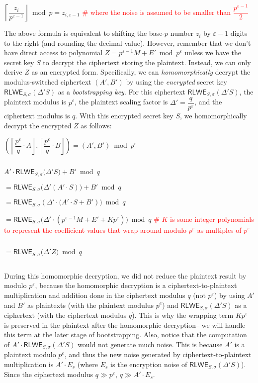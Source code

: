 $\left\lceil \dfrac{z_i}{p^{\varepsilon-1}} \right\rfloor \bmod p = z_{i,\varepsilon-1}$ \textcolor{red}{ \# where the noise is assumed to be smaller than $\dfrac{p^{\varepsilon-1}}{2}$}

The above formula is equivalent to shifting the base-$p$ number $z_i$ by $\varepsilon-1$ digits to the right (and rounding the decimal value). However, remember that we don't have direct access to polynomial $Z = p^{\varepsilon-1}M + E' \bmod p^\varepsilon$ unless we have the secret key $S$ to decrypt the ciphertext storing the plaintext. Instead, we can only derive $Z$ as an encrypted form. Specifically, we can \textit{homomorphically} decrypt the modulus-switched ciphertext $(A', B')$ by using the \textit{encrypted} secret key $\textsf{RLWE}_{S, \sigma}(\Delta' S)$ as a \textit{bootstrapping key}. For this ciphertext $\textsf{RLWE}_{S, \sigma}(\Delta' S)$, the plaintext modulus is $p^\varepsilon$, the plaintext scaling factor is $\Delta' = \dfrac{q}{p^\varepsilon}$, and the ciphertext modulus is $q$. With this encrypted secret key $S$, we homomorphically decrypt the encrypted $Z$ as follows: 


$\left(\left\lceil \dfrac{p^\varepsilon}{q}\cdot A\right\rfloor, \left\lceil \dfrac{p^\varepsilon}{q}\cdot B\right\rfloor\right) = (A', B') \bmod p^\varepsilon$ 

$ $

$A' \cdot \textsf{RLWE}_{S, \sigma}\bm(\Delta' S\bm) + B' \bmod q$


$= \textsf{RLWE}_{S, \sigma}\bm(\Delta' (A' \cdot S)\bm) + B' \bmod q$

$= \textsf{RLWE}_{S, \sigma}(\Delta' \cdot \bm(A'\cdot S + B')\bm) \bmod q$

$ = \textsf{RLWE}_{S, \sigma}\bm(\Delta' \cdot (p^{\varepsilon-1} M  + E' + Kp^\varepsilon)\bm) \bmod q$ \textcolor{red}{ \# $K$ is some integer polynomials to represent the coefficient values that wrap around modulo $p^\varepsilon$ as multiples of $p^\varepsilon$}

$ $

$ = \textsf{RLWE}_{S, \sigma}\bm(\Delta' Z\bm) \bmod q$

$ $

During this homomorphic decryption, we did not reduce the plaintext result by modulo $p^\varepsilon$, because the homomorphic decryption is a ciphertext-to-plaintext multiplication and addition done in the ciphertext modulus $q$ (not $p^{\varepsilon}$) by using $A'$ and $B'$ as plaintexts (with the plaintext modulus $p^e$) and $\textsf{RLWE}_{S, \sigma}(\Delta' S)$ as a ciphertext (with the ciphertext modulus $q$). This is why the wrapping term $Kp^\varepsilon$ is preserved in the plaintext after the homomorphic decryption-- we will handle this term at the later stage of bootstrapping. Also, notice that the computation of $A'\cdot \textsf{RLWE}_{S, \sigma}(\Delta' S)$ would not generate much noise. This is because $A'$ is a plaintext modulo $p^\varepsilon$, and thus the new noise generated by ciphertext-to-plaintext multiplication is $A' \cdot E_s$ (where $E_s$ is the encryption noise of $\textsf{RLWE}_{S, \sigma}(\Delta' S)$). Since the ciphertext modulus $q \gg p^\varepsilon$, $q \gg A' \cdot E_s$. 

